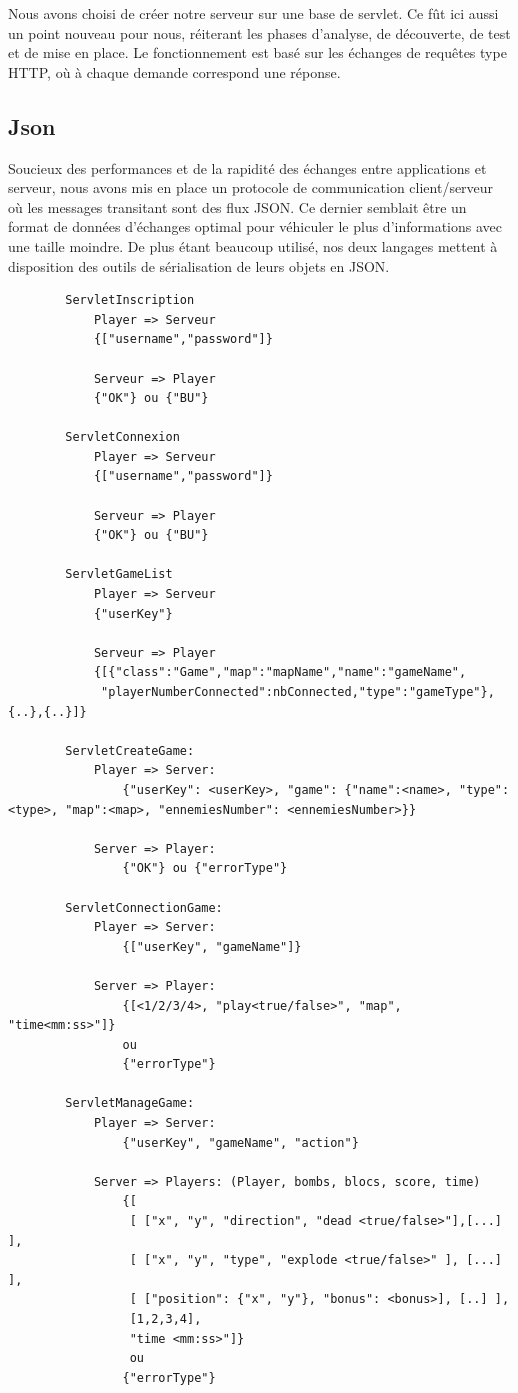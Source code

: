 Nous avons choisi de créer notre serveur sur une base de servlet. Ce fût ici
aussi un point nouveau pour nous, réiterant les phases d'analyse, de
découverte, de test et de mise en place. Le fonctionnement est basé sur les
échanges de requêtes type HTTP, où à chaque demande correspond une réponse. 

		
\subsection{Json}
	Soucieux des performances et de la rapidité des échanges entre applications et
	serveur, nous avons mis en place un protocole de communication client/serveur
	où les messages transitant sont des flux JSON. Ce dernier semblait être un
	format de données d'échanges optimal pour véhiculer le plus d'informations
	avec une taille moindre. De plus étant beaucoup utilisé, nos deux langages
	mettent à disposition des outils de sérialisation de leurs objets en JSON.
		
	\begin{verbatim}
		ServletInscription
			Player => Serveur
			{["username","password"]}
			
			Serveur => Player
			{"OK"} ou {"BU"}
			
		ServletConnexion 	
			Player => Serveur
			{["username","password"]}
			
			Serveur => Player
			{"OK"} ou {"BU"}
			
		ServletGameList
			Player => Serveur
			{"userKey"}
		
			Serveur => Player
			{[{"class":"Game","map":"mapName","name":"gameName",
			 "playerNumberConnected":nbConnected,"type":"gameType"},{..},{..}]}
			 
		ServletCreateGame:
			Player => Server:
				{"userKey": <userKey>, "game": {"name":<name>, "type":<type>, "map":<map>, "ennemiesNumber": <ennemiesNumber>}}
				
			Server => Player:
				{"OK"} ou {"errorType"}
			 
		ServletConnectionGame:
			Player => Server:
				{["userKey", "gameName"]}
				
			Server => Player:
				{[<1/2/3/4>, "play<true/false>", "map", "time<mm:ss>"]} 
				ou 
				{"errorType"}
				
		ServletManageGame:
			Player => Server: 
				{"userKey", "gameName", "action"}	
				
			Server => Players: (Player, bombs, blocs, score, time)
				{[
				 [ ["x", "y", "direction", "dead <true/false>"],[...] ],
				 [ ["x", "y", "type", "explode <true/false>" ], [...] ],
				 [ ["position": {"x", "y"}, "bonus": <bonus>], [..] ],
				 [1,2,3,4],
				 "time <mm:ss>"]} 
				 ou 
				{"errorType"}
			 
			 
	\end{verbatim}
		
